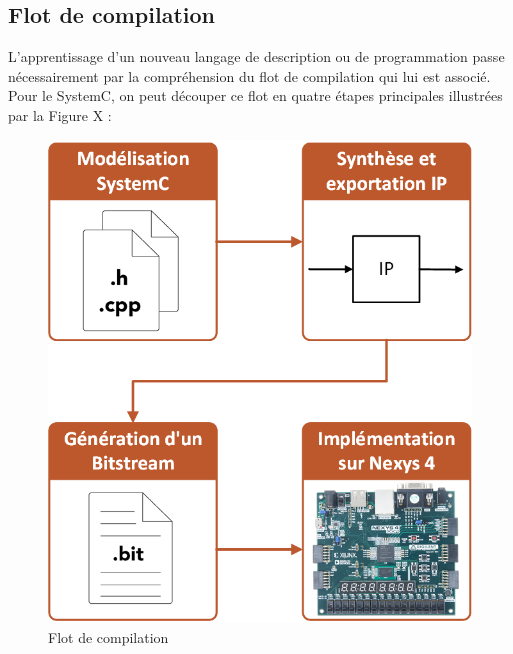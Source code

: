 \documentclass[a4paper,12pt]{article}
\begin{document}
\subsection{Flot de compilation}
	L'apprentissage d'un nouveau langage de description ou de programmation passe nécessairement par la compréhension du flot de compilation qui lui est associé. Pour le SystemC, on peut découper ce flot en quatre étapes principales illustrées par la Figure X :
	\begin{figure}[H]
		\centering
		\includegraphics[scale=0.5, keepaspectratio]{Dessin2.png}
		\caption{Flot de compilation}
	\end{figure}
\end{document}

